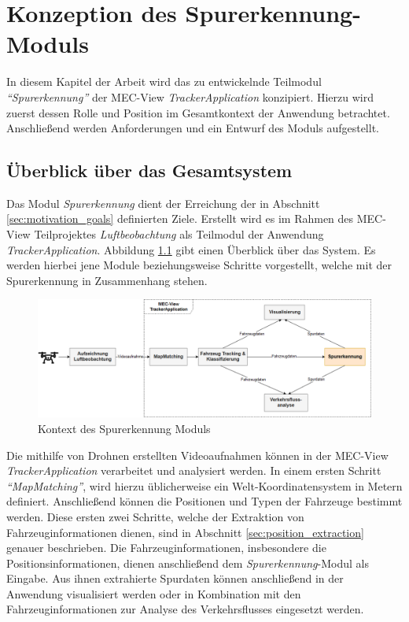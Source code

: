 
\chapter{Konzeption des Spurerkennung-Moduls}
\label{cha:konzeption}

In diesem Kapitel der Arbeit wird das zu entwickelnde Teilmodul \textit{``Spurerkennung''}
der MEC-View \textit{TrackerApplication} konzipiert. Hierzu wird zuerst dessen Rolle und Position im Gesamtkontext
der Anwendung betrachtet. Anschließend werden Anforderungen und ein Entwurf des Moduls aufgestellt.

\section{Überblick über das Gesamtsystem}

Das Modul \textit{Spurerkennung} dient der Erreichung der in Abschnitt
\ref{sec:motivation_goals} definierten Ziele. Erstellt wird es im Rahmen des MEC-View Teilprojektes
\textit{Luftbeobachtung} als Teilmodul der Anwendung \textit{TrackerApplication}.
Abbildung \ref{fig:concept_laneDetection_context} gibt einen Überblick über das System.
Es werden hierbei jene Module beziehungsweise Schritte vorgestellt, welche mit der Spurerkennung in
Zusammenhang stehen.

\begin{figure}[H]
    \centering
    \includegraphics[width=\linewidth]{../resources/img/konzeption/Context_LaneDetection}
    \caption{Kontext des Spurerkennung Moduls}
    \label{fig:concept_laneDetection_context}
\end{figure}

Die mithilfe von Drohnen erstellten Videoaufnahmen können in der MEC-View \textit{TrackerApplication}
verarbeitet und analysiert werden. In einem ersten Schritt \textit{``MapMatching''}, wird hierzu üblicherweise
ein Welt-Koordinatensystem in Metern definiert. Anschließend können die Positionen und Typen
der Fahrzeuge bestimmt werden. Diese ersten zwei Schritte, welche der Extraktion von Fahrzeuginformationen
dienen, sind in Abschnitt \ref{sec:position_extraction} genauer beschrieben.
Die Fahrzeuginformationen, insbesondere die Positionsinformationen, dienen anschließend dem \textit{Spurerkennung}-Modul
als Eingabe. Aus ihnen extrahierte Spurdaten können anschließend in der Anwendung visualisiert werden oder in Kombination
mit den Fahrzeuginformationen zur Analyse des Verkehrsflusses eingesetzt werden.


